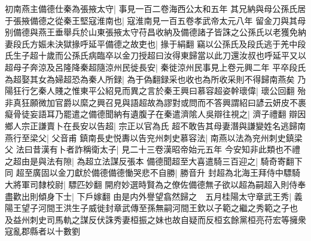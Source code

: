 初南燕主備德仕秦為張掖太守|{
	事見一百二卷海西公太和五年}
其兄納與母公孫氏居于張掖備德之從秦王堅寇淮南也|{
	寇淮南見一百五卷孝武帝太元八年}
留金刀與其母别備德與燕王垂舉兵於山東張掖太守苻昌收納及備德諸子皆誅之公孫氏以老獲免納妻段氏方娠未決獄掾呼延平備德之故吏也|{
	掾于絹翻}
竊以公孫氏及段氏逃于羌中段氏生子超十歲而公孫氏病臨卒以金刀授超曰汝得東歸當以此刀還汝叔也呼延平又以超母子奔涼及呂隆降秦超隨涼州民徙長安|{
	秦徙涼州民事見上卷元興二年}
平卒段氏為超娶其女為婦超恐為秦人所録|{
	為于偽翻録采也收也為所收采則不得歸南燕矣}
乃陽狂行乞秦人賤之惟東平公紹見而異之言於秦王興曰慕容超姿幹瓌偉|{
	瓌公回翻}
殆非真狂願微加官爵以縻之興召見與語超故為謬對或問而不答興謂紹曰諺云妍皮不裹癡骨徒妄語耳乃罷遣之備德聞納有遺腹子在秦遣濟隂人吳辯往視之|{
	濟子禮翻}
辯因鄉人宗正謙賣卜在長安以告超|{
	宗正以官為氏}
超不敢告其母妻潛與謙變姓名逃歸南燕行至梁父|{
	父音甫}
鎮南長史悦夀以告兖州刺史慕容法|{
	南燕以法為兖州刺史鎮梁父}
法曰昔漢有卜者詐稱衛太子|{
	見二十三卷漢昭帝始元五年}
今安知非此類也不禮之超由是與法有隙|{
	為超立法謀反張本}
備德聞超至大喜遣騎三百迎之|{
	騎奇寄翻下同}
超至廣固以金刀獻於備德備德慟哭悲不自勝|{
	勝音升}
封超為北海王拜侍中驃騎大將軍司隸校尉|{
	驃匹妙翻}
開府妙選時賢為之僚佐備德無子欲以超為嗣超入則侍奉盡歡出則傾身下士|{
	下戶嫁翻}
由是内外譽望翕然歸之　五月桂陽太守章武王秀|{
	義陽王望子河間王洪生子威徙封章武傳至孫無嗣河間王欽以子範之繼之秀範之子也}
及益州刺史司馬軌之謀反伏誅秀妻桓振之妹也故自疑而反桓玄餘黨桓亮苻宏等擁衆寇亂郡縣者以十數劉

